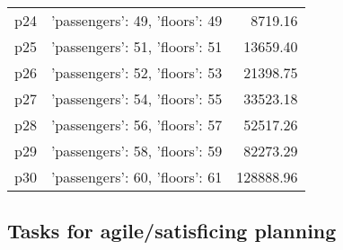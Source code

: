 \documentclass{article}
\begin{document}
\begin{center}
\begin{tabular}{@{}l|r|r@{}}
  p24&{'passengers': 49, 'floors': 49}&8719.16\\
  p25&{'passengers': 51, 'floors': 51}&13659.40\\
  p26&{'passengers': 52, 'floors': 53}&21398.75\\
  p27&{'passengers': 54, 'floors': 55}&33523.18\\
  p28&{'passengers': 56, 'floors': 57}&52517.26\\
  p29&{'passengers': 58, 'floors': 59}&82273.29\\
  p30&{'passengers': 60, 'floors': 61}&128888.96
                            \end{tabular}
                            \end{center}
                    

                                \subsection*{Tasks for agile/satisficing planning}
                                
\end{document}
